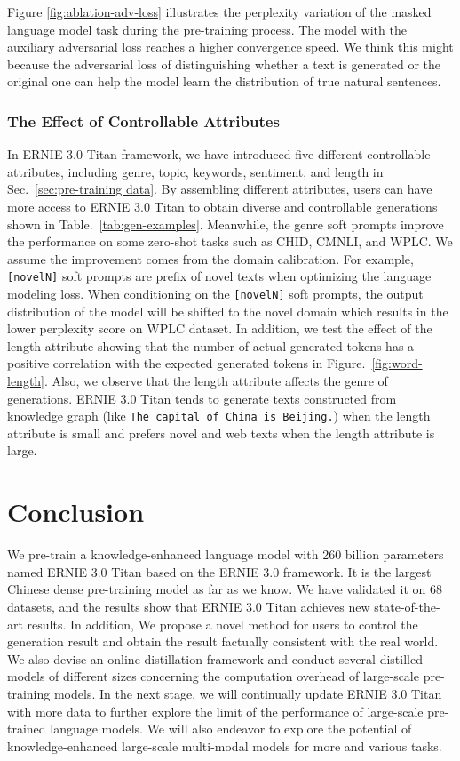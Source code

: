 Figure \ref{fig:ablation-adv-loss} illustrates the perplexity variation of the masked language model task during the pre-training process. The model with the auxiliary adversarial loss reaches a higher convergence speed. We think this might because the adversarial loss of distinguishing whether a text is generated or the original one can help the model learn the distribution of true natural sentences.

\subsubsection{The Effect of Controllable Attributes}

In ERNIE 3.0 Titan framework, we have introduced five different controllable attributes, including genre, topic, keywords, sentiment, and length in Sec.~\ref{sec:pre-training data}. By assembling different attributes, users can have more access to ERNIE 3.0 Titan to obtain diverse and controllable generations shown in Table.~\ref{tab:gen-examples}. Meanwhile, the genre soft prompts improve the performance on some zero-shot tasks such as CHID, CMNLI, and WPLC. We assume the improvement comes from the domain calibration. For example, \texttt{[novelN]} soft prompts are prefix of novel texts when optimizing the language modeling loss. When conditioning on the \texttt{[novelN]} soft prompts, the output distribution of the model will be shifted to the novel domain which results in the lower perplexity score on WPLC dataset. In addition, we test the effect of the length attribute showing that the number of actual generated tokens has a positive correlation with the expected generated tokens in Figure.~\ref{fig:word-length}. Also, we observe that the length attribute affects the genre of generations. ERNIE 3.0 Titan tends to generate texts constructed from knowledge graph (like \texttt{The capital of China is Beijing.}) when the length attribute is small and prefers novel and web texts when the length attribute is large. 

\section{Conclusion} 
We pre-train a knowledge-enhanced language model with 260 billion parameters named ERNIE 3.0 Titan based on the ERNIE 3.0 framework. It is the largest Chinese dense pre-training model as far as we know. We have validated it on 68 datasets, and the results show that ERNIE 3.0 Titan achieves new state-of-the-art results. In addition, We propose a novel method for users to control the generation result and obtain the result factually consistent with the real world. We also devise an online distillation framework and conduct several distilled models of different sizes concerning the computation overhead of large-scale pre-training models. In the next stage, we will continually update ERNIE 3.0 Titan with more data to further explore the limit of the performance of large-scale pre-trained language models. We will also endeavor to explore the potential of knowledge-enhanced large-scale multi-modal models for more and various tasks.


